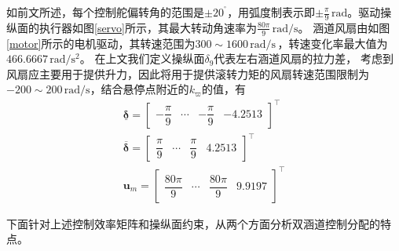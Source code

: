 如前文所述，每个控制舵偏转角的范围是$\pm {{20}^{{}^\circ }}$，用弧度制表示即$\pm {\frac{\pi}{9}\, \text{rad}}$。驱动操纵面的执行器如图\ref{servo}所示，其最大转动角速率为$\frac{80\pi}{9}\, {\text{rad}}/{\text{s}}$。 涵道风扇由如图\ref{motor}所示的电机驱动，其转速范围为$300 \sim 1600\,{\text{rad}}/{\text{s}}\,$，转速变化率最大值为$466.6667\,{\text{rad}}/{{{\text{s}}^{2}}}$。 在上文我们定义操纵面$\delta_9$代表左右涵道风扇的拉力差， 考虑到风扇应主要用于提供升力，因此将用于提供滚转力矩的风扇转速范围限制为$-200 \sim 200\,{\text{rad}}/{\text{s}}$，结合悬停点附近的$  k_{\varpi} $的值，有
\begin{gather}
\underline{\bm{\delta}}	=\left[ \begin{matrix}
-\dfrac{\pi}{9} & \cdots & -\dfrac{\pi}{9} & -4.2513 
\end{matrix} \right]^\top	\\
\overline{\bm{\delta}} =\left[ \begin{matrix}
\dfrac{\pi}{9}  & \cdots   & \dfrac{\pi}{9} & 4.2513  
\end{matrix} \right]^\top	\\
\bm{u}_{m}=\left[ \begin{matrix}
\dfrac{80\pi}{9}  & \cdots  & \dfrac{80\pi}{9}  & 9.9197  
\end{matrix} \right]^\top	\label{eq_TDF_constraint}
\end{gather}
  
下面针对上述控制效率矩阵和操纵面约束，从两个方面分析双涵道控制分配的特点。

